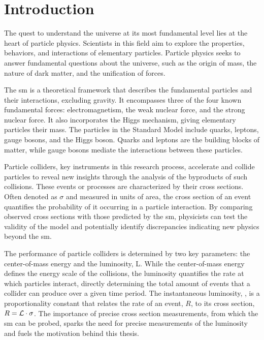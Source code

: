\chapter{Introduction}


The quest to understand the universe at its most fundamental level lies at the heart of particle physics. Scientists in this field aim to explore the properties, behaviors, and interactions of elementary particles. Particle physics seeks to answer fundamental questions about the universe, such as the origin of mass, the nature of dark matter, and the unification of forces.

The \acrfull{sm} is a theoretical framework that describes the fundamental particles and their interactions, excluding gravity. It encompasses three of the four known fundamental forces: electromagnetism, the weak nuclear force, and the strong nuclear force. It also incorporates the Higgs mechanism, giving elementary particles their mass. The particles in the Standard Model include quarks, leptons, gauge bosons, and the Higgs boson. Quarks and leptons are the building blocks of matter, while gauge bosons mediate the interactions between these particles.

Particle colliders, key instruments in this research process, accelerate and collide particles to reveal new insights through the analysis of the byproducts of such collisions. These events or processes are characterized by their cross sections. Often denoted as $\sigma$ and measured in units of area, the cross section of an event quantifies the probability of it occurring in a particle interaction. By comparing observed cross sections with those predicted by the \acrshort{sm}, physicists can test the validity of the model and potentially identify discrepancies indicating new physics beyond the \acrshort{sm}.

The performance of particle colliders is determined by two key parameters: the center-of-mass energy and the luminosity, L. While the center-of-mass energy defines the energy scale of the collisions, the luminosity quantifies the rate at which particles interact, directly determining the total amount of events that a collider can produce over a given time period. The instantaneous luminosity, \ilum, is a proportionality constant that relates the rate of an event, $R$, to its cross section, $R = \mathcal{L}  \cdot \sigma$. The importance of precise cross section measurements, from which the \acrshort{sm} can be probed, sparks the need for precise measurements of the luminosity and fuels the motivation behind this thesis.

